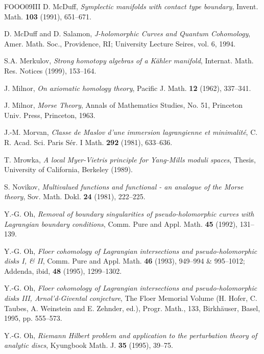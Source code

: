 \begin{thebibliography}{FOOO09III}
 D. McDuff, \emph{Symplectic manifolds with contact type boundary}, Invent. Math. \textbf{103} (1991), 651–671.

 D. McDuff and D. Salamon, \emph{J-holomorphic Curves and Quantum Cohomology}, Amer. Math. Soc., Providence, RI; University Lecture Seires, vol. 6, 1994.

 S.A. Merkulov, \emph{Strong homotopy algebras of a Kähler manifold}, Internat. Math. Res. Notices (1999), 153–164.

 J. Milnor, \emph{On axiomatic homology theory}, Pacific J. Math. \textbf{12} (1962), 337–341.

 J. Milnor, \emph{Morse Theory}, Annals of Mathematics Studies, No. 51, Princeton Univ. Press, Princeton, 1963.

 J.-M. Morvan, \emph{Classe de Maslov d'une immersion lagrangienne et minimalité}, C. R. Acad. Sci. Paris Sér. I Math. \textbf{292} (1981), 633–636.

 T. Mrowka, \emph{A local Myer-Vietris principle for Yang-Mills moduli spaces}, Thesis, University of California, Berkeley (1989).

 S. Novikov, \emph{Multivalued functions and functional - an analogue of the Morse theory}, Sov. Math. Dokl. \textbf{24} (1981), 222–225.

 Y.-G. Oh, \emph{Removal of boundary singularities of pseudo-holomorphic curves with Lagrangian boundary conditions}, Comm. Pure and Appl. Math. \textbf{45} (1992), 131– 139.

 Y.-G. Oh, \emph{Floer cohomology of Lagrangian intersections and pseudo-holomorphic disks I, \& II}, Comm. Pure and Appl. Math. \textbf{46} (1993), 949–994 \& 995–1012; Addenda, ibid, \textbf{48} (1995), 1299–1302.

 Y.-G. Oh, \emph{Floer cohomology of Lagrangian intersections and pseudo-holomorphic disks III, Arnol'd-Givental conjecture}, The Floer Memorial Volume (H. Hofer, C. Taubes, A. Weinstein and E. Zehnder, ed.), Progr. Math., 133, Birkhäuser, Basel, 1995, pp. 555–573.

 Y.-G. Oh, \emph{Riemann Hilbert problem and application to the perturbation theory of analytic discs}, Kyungbook Math. J. \textbf{35} (1995), 39–75.


\end{thebibliography}
